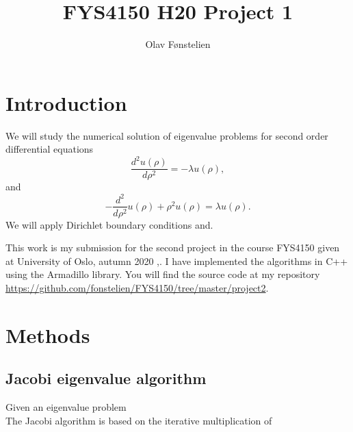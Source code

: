 \documentclass[]{article}
\title{FYS4150 H20 Project 1}
\author{Olav Fønstelien}
\begin{document}
\maketitle

\begin{abstract}

\end{abstract}

\section{Introduction}

We will study the numerical solution of eigenvalue problems for second order differential equations 
\[
\frac{d^2 u(\rho)}{d\rho^2} = -\lambda u(\rho),
\]
and
\[
-\frac{d^2}{d\rho^2} u(\rho) + \rho^2u(\rho)  = \lambda u(\rho).
\]
We will apply Dirichlet boundary conditions and.

This work is my submission for the second project in the course FYS4150 given at University of Oslo, autumn 2020 \cite{fys4150},\cite{fys4150-p2}. I have implemented the algorithms in C++ using the Armadillo library. You will find the source code at my repository \url{https://github.com/fonstelien/FYS4150/tree/master/project2}.


\section{Methods}

\subsection{Jacobi eigenvalue algorithm}
Given an eigenvalue problem \[\] The Jacobi algorithm is based on the iterative multiplication of 
\end{document}
